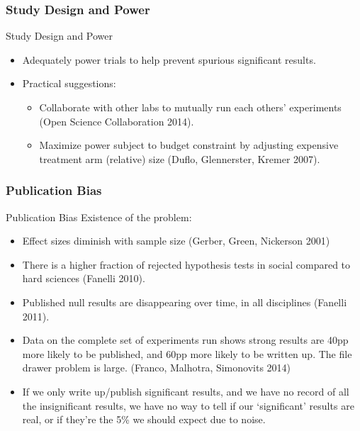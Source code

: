 \documentclass{beamer}
\begin{document}
\subsubsection*{Study Design and Power}
\begin{frame}{Study Design and Power}
\begin{itemize}[<.->]
\item
Adequately power trials to help prevent spurious significant results. 
\item
Practical suggestions:
\begin{itemize}
\item
Collaborate with other labs to mutually run each others' experiments (Open Science Collaboration 2014).
\item
Maximize power subject to budget constraint by adjusting expensive treatment arm (relative) size (Duflo, Glennerster, Kremer 2007). 
\end{itemize}
\end{itemize}
\end{frame}

\subsubsection*{Publication Bias}
\begin{frame}{Publication Bias}%
  Existence of the problem:
  \begin{itemize}[<.->]
  \item
 Effect sizes diminish with sample size (Gerber, Green, Nickerson 2001)
  \item
  There is a higher fraction of rejected hypothesis tests in social compared to hard sciences (Fanelli 2010).
  \item
  	Published null results are disappearing over time, in all disciplines (Fanelli 2011). 
  \item
  	Data on the complete set of experiments run shows strong results are 40pp more likely to be published, and 60pp more likely to be written up. The file drawer problem is large. (Franco, Malhotra, Simonovits 2014)
  	\item
  	If we only write up/publish significant results, and we have no record of all the insignificant results, we have no way to tell if our `significant' results are real, or if they're the 5\% we should expect due to noise.
  \end{itemize}
\end{frame}
\end{document}
